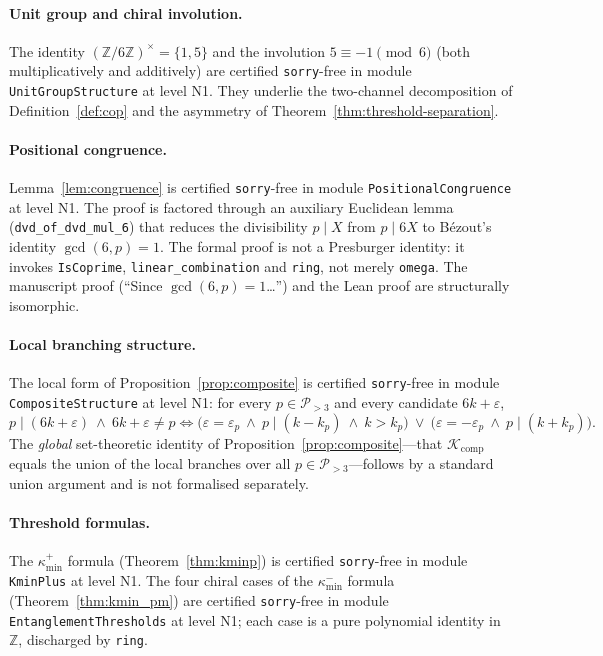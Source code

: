 \documentclass[11pt]{amsart}
\numberwithin{equation}{section}
\newcommand{\ZZ}{\mathbb{Z}}
\newcommand{\cP}{\mathcal{P}}
\newcommand{\cK}{\mathcal{K}}
\newcommand{\kminp}{\kappa_{\min}^{+}}
\newcommand{\kminm}{\kappa_{\min}^{-}}
\theoremstyle{plain}
\theoremstyle{definition}
\begin{document}
\paragraph{Unit group and chiral involution.}
The identity $(\ZZ/6\ZZ)^\times=\{1,5\}$ and the involution
$5\equiv-1\pmod 6$ (both multiplicatively and additively) are
certified \texttt{sorry}-free in module \texttt{UnitGroupStructure}
at level N1. They underlie the two-channel decomposition of
Definition~\ref{def:cop} and the asymmetry of
Theorem~\ref{thm:threshold-separation}.

\paragraph{Positional congruence.}
Lemma~\ref{lem:congruence} is certified \texttt{sorry}-free in module
\texttt{PositionalCongruence} at level N1. The proof is factored
through an auxiliary Euclidean lemma (\texttt{dvd\_of\_dvd\_mul\_6})
that reduces the divisibility $p\mid X$ from $p\mid 6X$ to B\'ezout's
identity $\gcd(6,p)=1$. The formal proof is not a Presburger
identity: it invokes \texttt{IsCoprime},
\texttt{linear\_combination} and \texttt{ring}, not merely
\texttt{omega}. The manuscript proof (``Since $\gcd(6,p)=1$\ldots'')
and the Lean proof are structurally isomorphic.

\paragraph{Local branching structure.}
The local form of Proposition~\ref{prop:composite} is certified
\texttt{sorry}-free in module \texttt{CompositeStructure} at level
N1: for every $p\in\cP_{>3}$ and every candidate $6k+\varepsilon$,
\begin{equation*}
p\mid(6k+\varepsilon)\ \wedge\ 6k+\varepsilon\neq p
\iff
\bigl(\varepsilon=\varepsilon_p\ \wedge\ p\mid(k-k_p)\ \wedge\ k>k_p\bigr)
\ \vee\
\bigl(\varepsilon=-\varepsilon_p\ \wedge\ p\mid(k+k_p)\bigr).
\end{equation*}
The \emph{global} set-theoretic identity of
Proposition~\ref{prop:composite}---that $\cK_{\mathrm{comp}}$ equals
the union of the local branches over all $p\in\cP_{>3}$---follows by a
standard union argument and is not formalised separately.

\paragraph{Threshold formulas.}
The $\kminp$ formula (Theorem~\ref{thm:kminp}) is certified
\texttt{sorry}-free in module \texttt{KminPlus} at level N1. The four
chiral cases of the $\kminm$ formula (Theorem~\ref{thm:kmin_pm}) are
certified \texttt{sorry}-free in module
\texttt{EntanglementThresholds} at level N1; each case is a pure
polynomial identity in $\ZZ$, discharged by \texttt{ring}.
\end{document}
